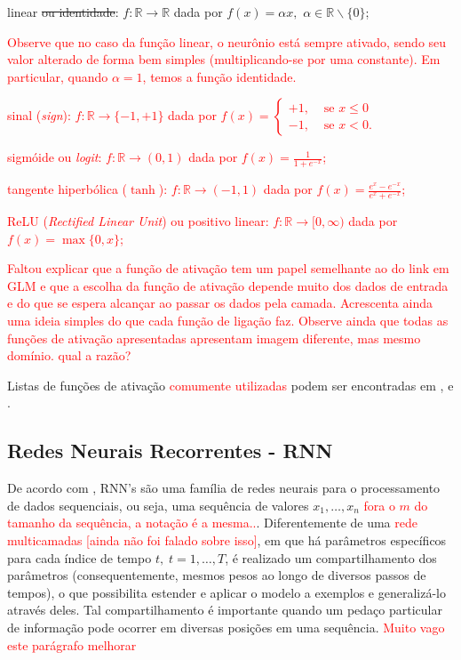 \documentclass{automatextcc}
\newcommand{\pumi}[1]{\textcolor{red}{#1}}
\newcommand{\R}{\mathds{R}}
\begin{document}
\begin{itemize}
    \item linear \sout{ou identidade}: $f: \R \rightarrow \R$ dada por $f(x) = \alpha x,$  $\alpha \in \R\backslash\{0\}$; \pumi{Observe que no caso da função linear, o neurônio está sempre ativado, sendo seu valor alterado de forma bem simples (multiplicando-se por uma constante). Em particular, quando $\alpha=1$, temos a função identidade.
    \item sinal (\textit{sign}): $f: \R \rightarrow \{-1,+1\}$ dada por  $f(x)=\begin{cases}
    +1, & \mbox{ se } x\leq0 \\
    -1, & \mbox{ se } x< 0.
    \end{cases}$
    \item sigmóide ou \textit{logit}: $f: \R \rightarrow (0,1)$ dada por $f(x) = \frac{1}{1 + e^{-x}}$;
    \item tangente hiperbólica ($\tanh$):  $f:\R \rightarrow (-1,1)$ dada por $f(x) = \frac{e^{x}-e^{-x}}{e^{x}+e^{-x}}$;
    \item ReLU (\textit{Rectified Linear Unit}) ou positivo linear: $f: \R \rightarrow [0,\infty)$ dada por $f(x) = \max\{0,x\}$;}
\end{itemize}
\pumi{Faltou explicar que a função de ativação tem um papel semelhante ao do link em GLM e que a escolha da função de ativação depende muito dos dados de entrada e do que se espera alcançar ao passar os dados pela camada. Acrescenta ainda uma ideia simples do que cada função de ligação faz. Observe ainda que todas as funções de ativação apresentadas apresentam imagem diferente, mas mesmo domínio. qual a razão?}

Listas de funções de ativação \pumi{comumente utilizadas} podem ser encontradas em \citet{nnDesign2014}, \citet{aggarwal2018DeepLearning} e \citet{dsa2021deeplearningbook}.


\subsection{Redes Neurais Recorrentes - RNN}
De acordo com \citet{mit2016deeplearningbook}, RNN's são uma família de redes neurais para o processamento de dados sequenciais, ou seja, uma sequência de valores $x_1,\dots,x_n$ \pumi{fora o $m$ do tamanho da sequência, a notação é a mesma..}. Diferentemente de uma \pumi{rede multicamadas [ainda não foi falado sobre isso]}, em que há parâmetros específicos para cada índice de tempo $t, \; t=1,\dots,T$, é realizado um compartilhamento dos parâmetros (consequentemente, mesmos pesos ao longo de diversos passos de tempos), o que possibilita estender e aplicar o modelo a exemplos e generalizá-lo através deles. Tal compartilhamento é importante quando um pedaço particular de informação pode ocorrer em diversas posições em uma sequência. \pumi{Muito vago este parágrafo melhorar}
\end{document}
